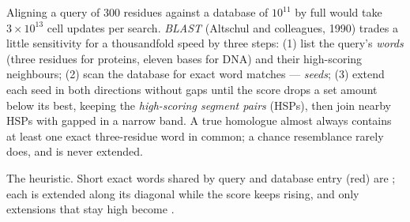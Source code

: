 \begin{definition}[BLAST]\label{def:b3:bioinformatics:blast}
Aligning a query of \num{300} residues against a database of $10^{11}$
by full  would take $3\times 10^{13}$ cell updates
per search. \emph{BLAST} (Altschul and colleagues, 1990) trades a little
sensitivity for a thousandfold speed by three steps: (1) list the
query's \emph{words} (three residues for proteins, eleven bases for
DNA) and their high-scoring neighbours; (2) scan the database for
exact word matches --- \emph{seeds}; (3) extend each seed in both
directions without gaps until the score drops a set amount below its
best, keeping the \emph{high-scoring segment pairs} (HSPs), then join
nearby HSPs with gapped  in a narrow band. A true
homologue almost always contains at least one exact three-residue
word in common; a chance resemblance rarely does, and is never
extended.
\end{definition}

\begin{omfigure}

{\small The  heuristic. Short exact words shared by query and
database entry (red) are ; each is extended along its diagonal
while the score keeps rising, and only extensions that stay high become
.}
\end{omfigure}

